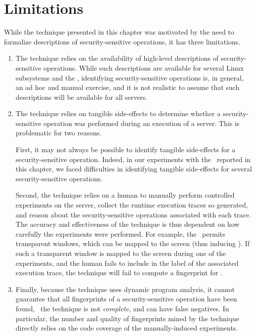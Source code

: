 \section{Limitations}
\label{chapter:dynamic:limitations}

While the technique presented in this chapter was motivated by the need to
formalize descriptions of security-sensitive operations, it has three
limitations. 

\begin{enumerate}

\item The technique relies on the availability of high-level descriptions of
security-sensitive operations. While such descriptions are available for
several Linux subsystems and the \xserver, identifying security-sensitive
operations is, in general, an ad hoc and manual exercise, and it is not
realistic to assume that such descriptions will be available for all servers.

\item The technique relies on tangible side-effects to determine whether a
security-sensitive operation was performed during an execution of a server.
This is problematic for two reasons. 

First, it may not always be possible to identify tangible side-effects for a
security-sensitive operation. Indeed, in our experiments with the \xserver\
reported in this chapter, we faced difficulties in identifying tangible
side-effects for several security-sensitive operations.

Second, the technique relies on a human to manually perform controlled
experiments on the server, collect the runtime execution traces so generated,
and reason about the security-sensitive operations associated with each trace.
The accuracy and effectiveness of the technique is thus dependent on how
carefully the experiments were performed. For example, the \xserver\ permits
transparent windows, which can be mapped to the screen (thus inducing
). If such a transparent window is mapped to the screen during
one of the experiments, and the human fails to include  in 
the label of the associated execution trace, the technique will fail to compute
a fingerprint for \op{Window\_Map}.

\item Finally, because the technique uses dynamic program analysis, it cannot
guarantee that all fingerprints of a security-sensitive operation have been
found, \ie~the technique is not \textit{complete}, and can have false
negatives. In particular, the number and quality of fingerprints mined by the
technique directly relies on the code coverage of the manually-induced
experiments.

\end{enumerate}

